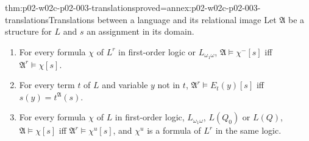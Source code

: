 \begin{hblemma}{thm:p02-w02c-p02-003-translations}{proved=annex:p02-w02c-p02-003-translations}{Translations between a language and its relational image}
Let \(\mathfrak A\) be a structure for \(L\) and \(s\) an assignment in its
domain.
\begin{enumerate}
\item For every formula \(\chi\) of \(L^{r}\) in first-order logic or
      \(L_{\omega_1\omega}\), \(\mathfrak A\models\chi^{-}[s]\) iff
      \(\mathfrak A^{r}\models\chi[s]\).
\item For every term \(t\) of \(L\) and variable \(y\) not in \(t\),
      \(\mathfrak A^{r}\models E_t(y)[s]\) iff
      \(s(y)=t^{\mathfrak A}(s)\).
\item For every formula \(\chi\) of \(L\) in first-order logic,
      \(L_{\omega_1\omega}\), \(L(Q_0)\) or \(L(Q)\),
      \(\mathfrak A\models\chi[s]\) iff \(\mathfrak A^{r}\models\chi^{u}[s]\),
      and \(\chi^{u}\) is a formula of \(L^{r}\) in the same logic.
\end{enumerate}
\end{hblemma}

